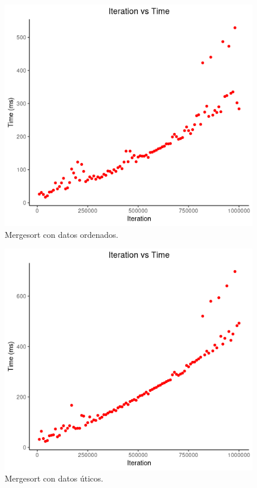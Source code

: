\documentclass[paper=a4, fontsize=11pt]{scrartcl} %
\numberwithin{equation}{section} %
\numberwithin{figure}{section} %
\numberwithin{table}{section} %
\begin{document}
\begin{figure}
    \includegraphics[width=\linewidth]{merge_ordered.png}
    \caption{Mergesort con datos ordenados.}
\end{figure}

\begin{figure}
    \includegraphics[width=\linewidth]{merge_unique.png}
    \caption{Mergesort con datos úticos.}
\end{figure}
\end{document}
